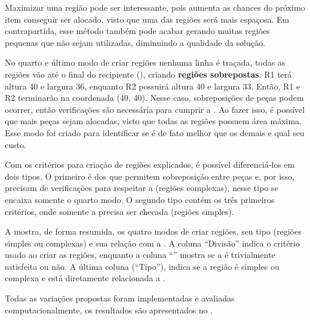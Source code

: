 

Maximizar uma região pode ser interessante, pois aumenta as chances do próximo item conseguir ser
alocado, visto que uma das regiões será mais espaçosa.
Em contrapartida, esse método também pode acabar gerando muitas regiões pequenas que não sejam
utilizadas, diminuindo a qualidade da solução.

No quarto e último modo de criar regiões nenhuma linha é traçada, todas as regiões vão até o final
do recipiente (), criando \textbf{regiões sobrepostas}.
R1 terá altura 40 e largura 36, enquanto R2 possuirá altura 40 e largura 33.
Então, R1 e R2 terminarão na coordenada (40, 40).
Nesse caso, sobreposições de peças podem ocorrer, então verificações são necessária para cumprir
a .
Ao fazer isso, é possível que mais peças sejam alocadas, visto que todas as regiões possuem área
máxima.
Esse modo foi criado para identificar se é de fato melhor que os demais e qual seu custo.



Com os critérios para criação de regiões explicados, é possível diferenciá-los em dois tipos.
O primeiro é dos que permitem sobreposição entre peças e, por isso, precisam de verificações para
respeitar a  (regiões complexas), nesse tipo se encaixa somente o quarto modo.
O segundo tipo contém os três primeiros critérios, onde somente a  precisa ser checada
(regiões simples).

A  mostra, de forma resumida, os quatro modos de criar regiões,
seu tipo (regiões simples ou complexas) e sua relação com a .
A coluna “Divisão” indica o critério usado ao criar as regiões, enquanto a coluna “”
mostra se a  é trivialmente satisfeita ou não.
A última coluna (“Tipo”), indica se a região é simples ou complexa e está diretamente relacionada
a .



Todas as variações propostas foram implementadas e avaliadas computacionalmente, os resultados
são apresentados no .
